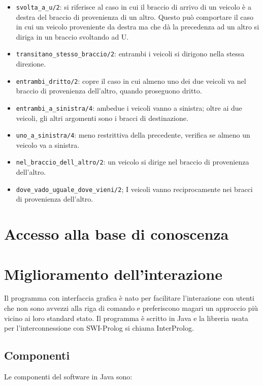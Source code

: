 \begin{itemize}
	\item \texttt{svolta\_a\_u/2}: si riferisce al caso in cui il braccio di arrivo di un veicolo è a destra del braccio di provenienza di un altro. Questo può comportare il caso in cui un veicolo proveniente da destra ma che dà la precedenza ad un altro si diriga in un braccio svoltando ad U.
	
	\item \texttt{transitano\_stesso\_braccio/2}: entrambi i veicoli si dirigono nella stessa direzione.
	
	\item \texttt{entrambi\_dritto/2}: copre il caso in cui almeno uno dei due veicoli va nel braccio di provenienza dell'altro, quando proseguono dritto.
	
	\item \texttt{entrambi\_a\_sinistra/4}: ambedue i veicoli vanno a sinistra; oltre ai due veicoli, gli altri argomenti sono i bracci di destinazione.
	
	\item \texttt{uno\_a\_sinistra/4}: meno restrittiva della precedente, verifica se almeno un veicolo va a sinistra.
	
	\item \texttt{nel\_braccio\_dell\_altro/2}: un veicolo si dirige nel braccio di provenienza dell'altro.
	
	\item \texttt{dove\_vado\_uguale\_dove\_vieni/2}; I veicoli vanno reciprocamente nei bracci di provenienza dell'altro.
\end{itemize}

\section{Accesso alla base di conoscenza}

\section{Miglioramento dell'interazione}
Il programma con interfaccia grafica è nato per facilitare l'interazione con utenti che non sono avvezzi alla riga di comando e preferiscono magari un approccio più vicino ai loro standard stato. Il programma è scritto in Java e la libreria usata per l'interconnessione con SWI-Prolog si chiama InterProlog.

\subsection{Componenti}
Le componenti del software in Java sono:

